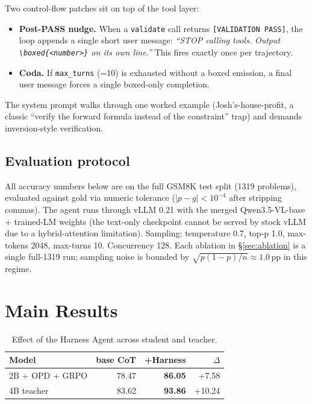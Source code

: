 \documentclass[10pt]{article}
\begin{document}
Two control-flow patches sit on top of the tool layer:
\begin{itemize}
  \item \textbf{Post-PASS nudge.} When a \texttt{validate} call returns \texttt{[VALIDATION PASS]}, the loop appends a single short user message: \emph{``STOP calling tools. Output \texttt{\textbackslash boxed\{<number>\}} on its own line.''} This fires exactly once per trajectory.
  \item \textbf{Coda.} If \texttt{max\_turns} (=10) is exhausted without a boxed emission, a final user message forces a single boxed-only completion.
\end{itemize}

The system prompt walks through one worked example (Josh's-house-profit, a classic ``verify the forward formula instead of the constraint'' trap) and demands inversion-style verification.

\subsection{Evaluation protocol}

All accuracy numbers below are on the full GSM8K test split (1319 problems), evaluated against gold via numeric tolerance ($|p-g|<10^{-4}$ after stripping commas). The agent runs through vLLM 0.21 with the merged Qwen3.5-VL-base + trained-LM weights (the text-only checkpoint cannot be served by stock vLLM due to a hybrid-attention limitation). Sampling: temperature 0.7, top-p 1.0, max-tokens 2048, max-turns 10. Concurrency 128. Each ablation in \S\ref{sec:ablation} is a single full-1319 run; sampling noise is bounded by $\sqrt{p(1-p)/n} \approx 1.0$\,pp in this regime.

\section{Main Results}
\label{sec:results}

\begin{table}[h]
\centering
\caption{Effect of the Harness Agent across student and teacher.}
\label{tab:main}
\begin{tabular}{lrrr}
\toprule
Model & base CoT & +Harness & $\Delta$ \\
\midrule
2B + OPD + GRPO & 78.47 & \textbf{86.05} & +7.58 \\
4B teacher      & 83.62 & \textbf{93.86} & +10.24 \\
\bottomrule
\end{tabular}
\end{table}
\end{document}
